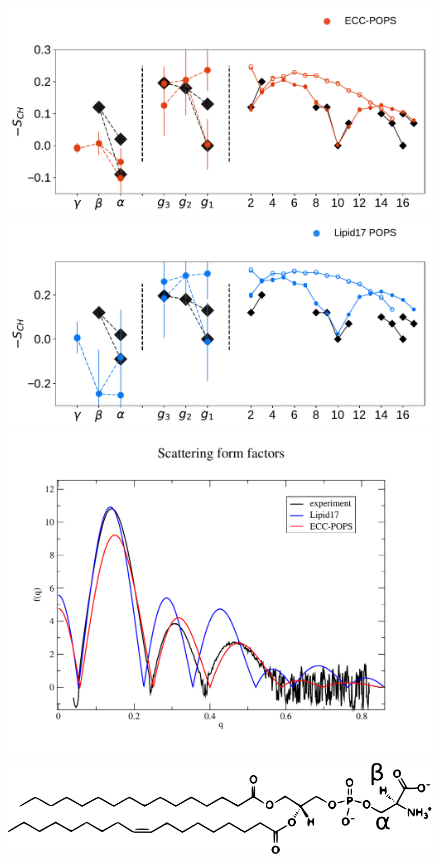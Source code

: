 \begin{figure}[tb!] 
  \centering 
  \includegraphics[width=\figwidth]{../img/ecc_pops/order_parameters_actual_pure-POPS.pdf} 
  \includegraphics[width=\figwidth]{../img/ecc_pops/l17/order_parameters_actual_pure-POPS.pdf} 
  \includegraphics[width=\figwidth]{../img/ecc_pops/form-f_l17-ecc-pops-exp_compar.pdf} 
  \includegraphics[width=\figwidth]{../img/ecc_pops/pops_chemfig.pdf} 

\end{figure}
